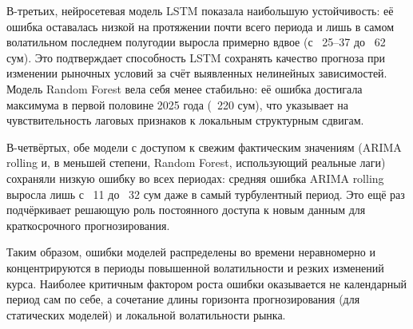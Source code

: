 В-третьих, нейросетевая модель LSTM показала наибольшую устойчивость: её ошибка оставалась низкой на протяжении почти всего периода и лишь в самом волатильном последнем полугодии выросла примерно вдвое (с ~25--37 до ~62 сум). Это подтверждает способность LSTM сохранять качество прогноза при изменении рыночных условий за счёт выявленных нелинейных зависимостей. Модель Random Forest вела себя менее стабильно: её ошибка достигала максимума в первой половине 2025 года (~220 сум), что указывает на чувствительность лаговых признаков к локальным структурным сдвигам.

В-четвёртых, обе модели с доступом к свежим фактическим значениям (ARIMA rolling и, в меньшей степени, Random Forest, использующий реальные лаги) сохраняли низкую ошибку во всех периодах: средняя ошибка ARIMA rolling выросла лишь с ~11 до ~32 сум даже в самый турбулентный период. Это ещё раз подчёркивает решающую роль постоянного доступа к новым данным для краткосрочного прогнозирования.

Таким образом, ошибки моделей распределены во времени неравномерно и концентрируются в периоды повышенной волатильности и резких изменений курса. Наиболее критичным фактором роста ошибки оказывается не календарный период сам по себе, а сочетание длины горизонта прогнозирования (для статических моделей) и локальной волатильности рынка.
